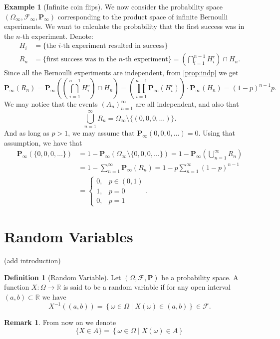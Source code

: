 \documentclass[11pt,a4paper]{article}
\theoremstyle{definition}
\newtheorem{definition}{Definition}[section]
\newtheorem{remark}{Remark}[section]
\newtheorem{example}{Example}[section]
\theoremstyle{plain}
\newcommand{\R}{\mathbb{R}}
\newcommand{\Prob}{\mathbf{P}}
\newcommand{\set}[2]{ \left\{ #1 \mid #2 \right\} }
\begin{document}
  \begin{example}[Infinite coin flips]
    We now consider the probability space 
    $(\Omega_{\infty}, \mathcal F_{\infty}, \Prob_{\infty})$
    corresponding to the product space of infinite Bernoulli experiments.
    We want to calculate the probability that the first success was in 
    the $n$-th experiment. Denote:
    \begin{align*}
      H_i &= \{\text{the $i$-th experiment resulted in success}\} \\
      R_n &= \{\text{first success was in the $n$-th experiment}\} = 
      \left(\bigcap_{i=1}^{n-1} H_i^c\right) \cap H_n.
    \end{align*}
    Since all the Bernoulli experiments are independent, from 
    \autoref{prop:indp} we get
    \[
      \Prob_{\infty}(R_{n}) = 
      \Prob_{\infty} \left(\left(\bigcap_{i=1}^{n-1} H_i^c\right) \cap H_n\right) = 
      \left(\prod_{i=1}^{n-1} \Prob_{\infty} \left(H_{i}^{c}\right)\right) \cdot \Prob_{\infty} \left(H_{n}\right) =
      (1-p)^{n-1}p.
    \]
    We may notice that the events $(A_n)_{n=1}^{\infty}$ are all independent,
    and also that
    \[
      \bigcup_{n=1}^{\infty} R_n = \Omega_\infty \setminus \{(0,0,0,\dots)\}.
    \]
    And as long as $p > 1$, we may assume that 
    $\Prob_\infty(0,0,0,\dots) = 0$.
    Using that assumption, we have that
    \begin{align*}
      \Prob_{\infty}(\{0,0,0,\dots\}) &= 
      1 - \Prob_\infty(\Omega_\infty \setminus \{0,0,0,\dots\}) =
      1 - \Prob_\infty(\bigcup_{n=1}^{\infty} R_n) \\ &=
      1 - \sum_{n=1}^{\infty} \Prob_\infty(R_n) =
      1 - p \sum_{n=1}^{\infty} (1-p)^{n-1} \\ &=
      \begin{cases}
        0, &p \in (0,1) \\
        1, &p = 0 \\
        0, &p = 1
      \end{cases}.
    \end{align*}
  \end{example}

  \newpage

  \section{Random Variables}
  (add introduction)
  \begin{definition}[Random Variable]
    Let $(\Omega, \mathcal F, \Prob)$ be a probability space.
    A function $X \colon \Omega \to \R$ is said to be a random variable if for
    any open interval $(a,b) \subset \R$ we have
    \[
      X^{-1}\left((a,b)\right) = 
      \set{\omega \in \Omega}{X(\omega) \in (a,b)} \in \mathcal F.
    \]
  \end{definition}
  \begin{remark}
    From now on we denote
    \[
      \{X \in A\} = \set{\omega \in \Omega}{X(\omega) \in A}
    \]
  \end{remark}
  
\end{document}
